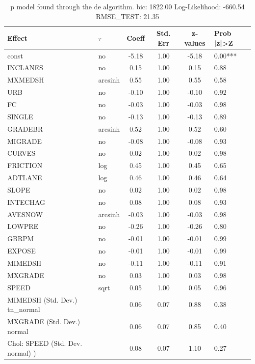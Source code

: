 \begin{table}
	\caption{p model found through the de algorithm. bic: 1822.00 Log-Likelihood: -660.54 RMSE_TEST: 21.35}
	\begin{center}
		\begin{tabular}{|l|l|c|c|c|l|}
			\hline
			Effect & $\tau$ & Coeff & Std. Err & z-values & Prob |z|>Z \\
			\hline
			const & no & -5.18 & 1.00 & -5.18 & 0.00*** \\
			\hline
			INCLANES & no & 0.15 & 1.00 & 0.15 & 0.88 \\
			\hline
			MXMEDSH & arcsinh & 0.55 & 1.00 & 0.55 & 0.58 \\
			\hline
			URB & no & -0.10 & 1.00 & -0.10 & 0.92 \\
			\hline
			FC & no & -0.03 & 1.00 & -0.03 & 0.98 \\
			\hline
			SINGLE & no & -0.13 & 1.00 & -0.13 & 0.89 \\
			\hline
			GRADEBR & arcsinh & 0.52 & 1.00 & 0.52 & 0.60 \\
			\hline
			MIGRADE & no & -0.08 & 1.00 & -0.08 & 0.93 \\
			\hline
			CURVES & no & 0.02 & 1.00 & 0.02 & 0.98 \\
			\hline
			FRICTION & log & 0.45 & 1.00 & 0.45 & 0.65 \\
			\hline
			ADTLANE & log & 0.46 & 1.00 & 0.46 & 0.64 \\
			\hline
			SLOPE & no & 0.02 & 1.00 & 0.02 & 0.98 \\
			\hline
			INTECHAG & no & 0.08 & 1.00 & 0.08 & 0.93 \\
			\hline
			AVESNOW & arcsinh & -0.03 & 1.00 & -0.03 & 0.98 \\
			\hline
			LOWPRE & no & -0.26 & 1.00 & -0.26 & 0.80 \\
			\hline
			GBRPM & no & -0.01 & 1.00 & -0.01 & 0.99 \\
			\hline
			EXPOSE & no & -0.01 & 1.00 & -0.01 & 0.99 \\
			\hline
			MIMEDSH & no & -0.11 & 1.00 & -0.11 & 0.91 \\
			\hline
			MXGRADE & no & 0.03 & 1.00 & 0.03 & 0.98 \\
			\hline
			SPEED & sqrt & 0.05 & 1.00 & 0.05 & 0.96 \\
			\hline
			MIMEDSH (Std. Dev.) tn_normal &  & 0.06 & 0.07 & 0.88 & 0.38 \\
			\hline
			MXGRADE (Std. Dev.) normal &  & 0.06 & 0.07 & 0.85 & 0.40 \\
			\hline
			 Chol: SPEED (Std. Dev. normal) ) &  & 0.08 & 0.07 & 1.10 & 0.27 \\
			\hline
		\end{tabular}
	\end{center}
\end{table}